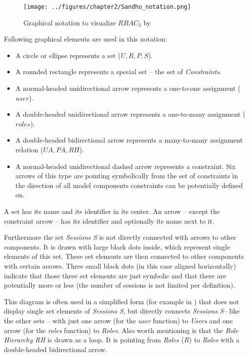 \documentclass[twoside, openright, 12pt]{book}
\begin{document}
\begin{figure}[htb]
	\centering
	\texttt{[image: ../figures/chapter2/Sandhu\_notation.png]}
	\caption{Graphical notation to visualize $RBAC_3$ by \cite{Sandhu96} }
	\label{fig:Sandhu_notation}
\end{figure}

\noindent
Following graphical elements are used in this notation:

\begin{itemize}
\item A circle or ellipse represents a set ($U, R, P, S$).
\item A rounded rectangle represents a special set -- the set of \textit{Constraints}.
\item A normal-headed unidirectional arrow represents a one-to-one assignment ($user$).
\item A double-headed unidirectional arrow represents a one-to-many assignment ($roles$).
\item A double-headed bidirectional arrow represents a many-to-many assignment relation ($UA, PA, RH$).
\item A normal-headed unidirectional dashed arrow represents a constraint.
Six arrows of this type are pointing symbolically from the set of constraints in the direction of all model components constraints can be potentially defined on.
\end{itemize}

\noindent
A set has its name and its identifier in its center.
An arrow -- except the constraint arrow -- has its identifier and optionally its name next to it.

Furthermore the set \textit{Sessions S} is not directly connected with arrows to other components.
It is drawn with large black dots inside, which represent single elements of this set.
These set elements are then connected to other components with certain arrows.
Three small black dots (in this case aligned horizontally) indicate that those three set elements are just symbolic and that there are potentially more or less (the number of sessions is not limited per definition).

This diagram is often used in a simplified form (for example in \citep{Amthor18}) that does not display single set elements of \textit{Sessions S}, but directly connects \textit{Sessions S}-- like the other sets -- with just one arrow (for the \textit{user} function) to \textit{Users} and one arrow (for the \textit{roles} function) to \textit{Roles}.
Also worth mentioning is that the \textit{Role Hierarchy RH} is drawn as a loop. 
It is pointing from \textit{Roles} ($R$) to \textit{Roles} with a double-headed bidirectional arrow.
\end{document}
